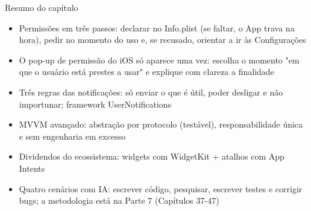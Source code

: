 \begin{tcbsummary}{Resumo do capítulo}
\begin{itemize}
  \item Permissões em três passos: declarar no Info.plist (se faltar, o App trava na hora), pedir no momento do uso e, se recusado, orientar a ir às Configurações
  \item O pop-up de permissão do iOS só aparece uma vez: escolha o momento "em que o usuário está prestes a usar" e explique com clareza a finalidade
  \item Três regras das notificações: só enviar o que é útil, poder desligar e não importunar; framework UserNotifications
  \item MVVM avançado: abstração por protocolo (testável), responsabilidade única e sem engenharia em excesso
  \item Dividendos do ecossistema: widgets com WidgetKit + atalhos com App Intents
  \item Quatro cenários com IA: escrever código, pesquisar, escrever testes e corrigir bugs; a metodologia está na Parte 7 (Capítulos 37-47)
\end{itemize}

\end{tcbsummary}
